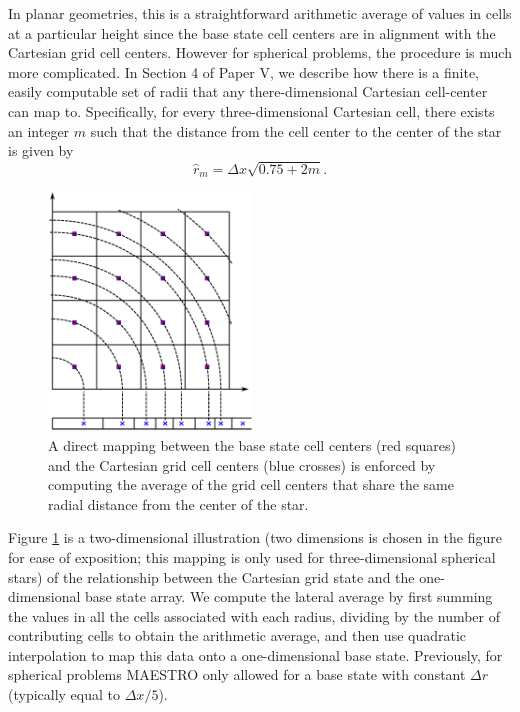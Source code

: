 \documentclass{aastex62}
\begin{document}
In planar geometries, this is a straightforward arithmetic average of values in cells at
a particular height since the base state cell centers are in alignment
with the Cartesian grid cell centers.
However for spherical problems, the procedure is much more complicated.
In Section 4 of Paper V, we describe how there is a finite, easily computable set of radii that any 
there-dimensional Cartesian cell-center can map to.  
Specifically, for every three-dimensional Cartesian cell, there exists an integer $m$ such that the distance
from the cell center to the center of the star is given by 
\begin{equation}
\hat{r}_m=\Delta x\sqrt{0.75+2m}.\label{eqn:radii}
\end{equation}
\begin{figure}[tb]
\centering
\includegraphics[height=2.5in]{base_spherical_new.eps}
\caption{\label{Fig:NewBaseGrid}  
A direct mapping between the base state cell centers (red squares) and the Cartesian grid cell centers (blue crosses) 
is enforced by computing the average of the grid cell centers that share the same radial distance from 
the center of the star.}
\end{figure}
Figure \ref{Fig:NewBaseGrid} is a two-dimensional illustration 
(two dimensions is chosen in the figure for ease of exposition; this mapping is only used for three-dimensional spherical stars) 
of the relationship between the Cartesian grid state and the one-dimensional base state array.
We compute the lateral average by first summing the values in all the cells associated with each radius,
dividing by the number of contributing cells to obtain the arithmetic average, and then use quadratic interpolation to map this data onto a one-dimensional base state.
Previously, for spherical problems MAESTRO only allowed for a base state with constant $\Delta r$ (typically equal to $\Delta x/5$).
\end{document}

